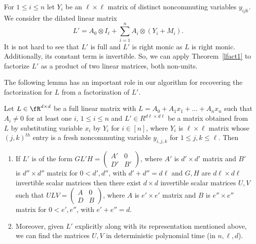 For $1\le i\le n$ let $Y_i$ be an $\ell\times \ell$ matrix of distinct
noncommuting variables $y_{ijk}$. We consider the dilated linear
matrix
\begin{equation}\label{dilate-eq1}
L' = A_0\otimes I_\ell + \sum_{i=1}^n A_i\otimes (Y_i+M_i).
\end{equation}
It is not hard to see that $L'$ is full and $L'$ is right monic as  $L$ is right monic. Additionally, its constant term is 
invertible. So, we can apply Theorem~\ref{lfact1} to factorize $L'$ as
a product of two linear matrices, both non-units.

The following lemma \cite{HKV20} has an important role in our
algorithm for recovering the factorization for $L$ from a
factorization of $L'$.

\begin{lemma}\cite{HKV20}\label{hkv20-main-lemma}

Let $L \in \fR^{d \times d}$ be a full linear matrix with $L= A_0+ A_1x_1+\ldots +A_n x_n$ such that $A_i \neq 0$ for at least one $i$, $1\leq i \leq n$ and $L'\in
R^{d\ell \times d\ell}$ be a matrix obtained from $L$ by substituting
variable $x_i$ by $Y_i$ for $i \in [n]$, where $Y_i$ is $\ell \times
\ell$ matrix whose $(j,k)^{th}$ entry is a fresh noncommuting variable
$y_{i,j,k}$ for $1 \leq j,k \leq \ell$. Then
\begin{enumerate}
\item If $L'$ is of the form $G L' H = \left(
\begin{array}{c|c}
A' & 0 \\
\hline
D' & B'
\end{array}
\right)$, where $A'$ is $d' \times d'$ matrix and $B'$ is $d'' \times d''$ matrix for $0< d', d''$, with $d'+d''=d\ell$ and $G,H$ are $d\ell \times d\ell$ invertible scalar matrices then there exist $d \times d$ invertible scalar matrices $U, V$ such that  $U L V = \left(
\begin{array}{c|c}
A & 0 \\
\hline
D & B
\end{array}
\right)$, where $A$ is $e' \times e'$ matrix and $B$ is $e'' \times e''$ matrix for $0<e', e''$, with $e' +e''= d$. 

\item Moreover, given $L'$ explicitly along with its representation
  mentioned above, we can find the matrices $U, V$ in deterministic
  polynomial time (in $n,\ell,d$).
\end{enumerate}
\end{lemma}

